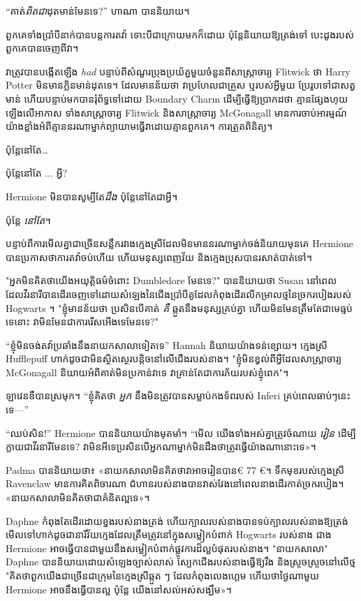 {“គាត់\emph{ពិតជា}ដុតមាន់មែនទេ?” ហាណា បាននិយាយ។

\later

ពួកគេទាំងប្រាំបីនាក់បានបន្តការតវ៉ា ទោះបីជាក្រោយមកក៏ដោយ ប៉ុន្តែនិយាយឱ្យត្រង់ទៅ បេះដូងរបស់ពួកគេបានចេញពីវា។

វាត្រូវបានបង្កើតឡើង \emph{had} បន្ទាប់ពីសំណួរប្រុងប្រយ័ត្នមួយចំនួនពីសាស្រ្តាចារ្យ Flitwick ថា Harry Potter មិនមានក្លិនមាន់ដុតទេ។ ដែលមានន័យថា វាប្រហែលជាគ្រួស ឬរបស់អ្វីមួយ ប្រែរូបទៅជាសត្វមាន់ ហើយបន្ទាប់មកបានរុំព័ទ្ធទៅដោយ Boundary Charm ដើម្បីធ្វើឱ្យប្រាកដថា គ្មានផ្សែងហុយឡើងលើអាកាស ទាំងសាស្ត្រាចារ្យ Flitwick និងសាស្រ្តាចារ្យ McGonagall មានការចាប់អារម្មណ៍យ៉ាងខ្លាំងអំពីគ្មាននរណាម្នាក់ព្យាយាមធ្វើវាដោយគ្មានពួកគេ។ ការត្រួតពិនិត្យ។

ប៉ុន្តែនៅតែ…

ប៉ុន្តែនៅតែ ... អ្វី?

Hermione មិនបានសូម្បីតែ\emph{ដឹង} ប៉ុន្តែនៅតែជាអ្វី។

ប៉ុន្តែ \emph{នៅតែ}។

បន្ទាប់​ពី​ការ​មើល​គ្នា​ជា​ច្រើន​សន្លឹក​រវាង​ក្មេង​ស្រី​ដែល​មិន​មាន​នរណា​ម្នាក់​ចង់​និយាយ​មុន​គេ Hermione បាន​ប្រកាស​ថា​ការ​តវ៉ា​ចប់​ហើយ ហើយ​មនុស្ស​ពេញ​វ័យ និង​ក្មេង​ប្រុស​បាន​រសាត់​បាត់​ទៅ។

"អ្នកមិនគិតថាយើងអយុត្តិធម៌ចំពោះ Dumbledore មែនទេ?" បាននិយាយថា Susan នៅពេលដែលវីរនារីបានដើរចេញទៅដោយសំឡេងនៃជើងប្រាំបីគូដែលកំពុងដើរលើកម្រាលថ្មនៃច្រករបៀងរបស់ Hogwarts ។ "ខ្ញុំមានន័យថា ប្រសិនបើគាត់ \emph{គឺ} ឆ្កួតនឹងមនុស្សគ្រប់គ្នា ហើយមិនមែនត្រឹមតែជាមេធ្មប់ទេនោះ វាមិនមែនជាការរើសអើងទេមែនទេ?"

“ខ្ញុំ​មិន​ចង់​តវ៉ា​ប្រឆាំង​នឹង​នាយក​សាលា​ទៀត​ទេ” Hannah និយាយ​យ៉ាង​ទន់​ខ្សោយ។ ក្មេងស្រី Hufflepuff ហាក់ដូចជាមិនស្ថិតស្ថេរបន្តិចនៅលើជើងរបស់នាង។ "ខ្ញុំមិនខ្វល់ពីអ្វីដែលសាស្រ្តាចារ្យ McGonagall និយាយអំពីគាត់មិនប្រកាន់វាទេ វាគ្រាន់តែជាការភ័យរបស់ខ្ញុំពេក"។

ឡាវេនឌឺបានស្រមុក។ “ខ្ញុំគិតថា \emph{អ្នក} នឹងមិនត្រូវបានសម្លាប់កងទ័ពរបស់ Inferi គ្រប់ពេលឆាប់ៗនេះទេ—”

“ឈប់សិន!” Hermione បាននិយាយយ៉ាងមុតមាំ។ “មើល យើងទាំងអស់គ្នាត្រូវចំណាយ \emph{រៀន} ដើម្បីក្លាយជាវីរនារីមែនទេ? វា​មិន​អី​ទេ​ប្រសិន​បើ​អ្នក​ណា​ម្នាក់​មិន​ដឹង​ថា​ត្រូវ​ធ្វើ​យ៉ាង​ណា​នោះ​ទេ»។

Padma បាន​និយាយ​ថា​៖ «​នាយក​សាលា​មិន​គិត​ថា​វា​អាច​រៀន​បាន​€ 77 €​។ ទឹកមុខរបស់ក្មេងស្រី Ravenclaw មានការគិតពិចារណា ជំហានរបស់នាងបានវាស់វែងនៅពេលនាងដើរកាត់ច្រករបៀង។ «នាយក​សាលា​មិន​គិត​ថា​ជា​គំនិត​ល្អ​ទេ»។

Daphne កំពុងតែដើរដោយខ្នងរបស់នាងត្រង់ ហើយក្បាលរបស់នាងបានទប់ក្បាលរបស់នាងឱ្យត្រង់ មើលទៅហាក់ដូចជានារីវ័យក្មេងដែលត្រឹមត្រូវនៅក្នុងសម្លៀកបំពាក់ Hogwarts របស់នាង ជាង Hermione អាចធ្វើបានជាមួយនឹងសម្លៀកបំពាក់ផ្លូវការដ៏ល្អបំផុតរបស់នាង។ "នាយកសាលា" Daphne បាននិយាយដោយសំឡេងច្បាស់លាស់ ស្បែកជើងរបស់នាងធ្វើឱ្យរឹង និងស្រួចស្រួចនៅលើថ្ម "គិតថាពួកយើងជាច្រើនជាក្រុមនៃក្មេងស្រីឆ្កួត ៗ ដែលកំពុងលេងហ្គេម ហើយថាថ្ងៃណាមួយ Hermione អាចនឹងធ្វើបានល្អ ប៉ុន្តែ យើង​នៅ​សល់​អស់​សង្ឃឹម»។

}
